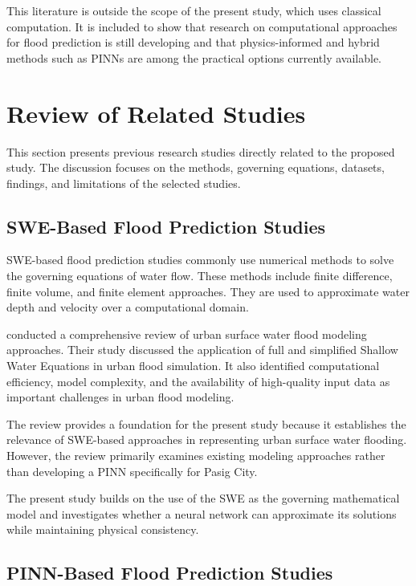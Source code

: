 This literature is outside the scope of the present study, which uses classical computation. It is included to show that research on computational approaches for flood prediction is still developing and that physics-informed and hybrid methods such as PINNs are among the practical options currently available.
\section{Review of Related Studies}

This section presents previous research studies directly related to the proposed study. The discussion focuses on the methods, governing equations, datasets, findings, and limitations of the selected studies.

\subsection{SWE-Based Flood Prediction Studies}

SWE-based flood prediction studies commonly use numerical methods to solve the governing equations of water flow. These methods include finite difference, finite volume, and finite element approaches. They are used to approximate water depth and velocity over a computational domain.

 conducted a comprehensive review of urban surface water flood modeling approaches. Their study discussed the application of full and simplified Shallow Water Equations in urban flood simulation. It also identified computational efficiency, model complexity, and the availability of high-quality input data as important challenges in urban flood modeling.

The review provides a foundation for the present study because it establishes the relevance of SWE-based approaches in representing urban surface water flooding. However, the review primarily examines existing modeling approaches rather than developing a PINN specifically for Pasig City.

The present study builds on the use of the SWE as the governing mathematical model and investigates whether a neural network can approximate its solutions while maintaining physical consistency.

\subsection{PINN-Based Flood Prediction Studies}

